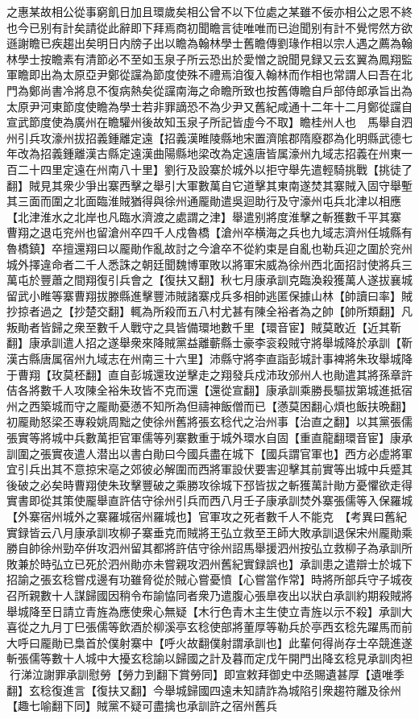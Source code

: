 之惠某故相公從事窮飢日加且環歲矣相公曾不以下位處之某雖不佞亦相公之恩不終也今已别有計矣請從此辭即下拜焉商初聞瞻言徒唯唯而已迨聞别有計不覺愕然方欲遜謝瞻已疾趨出矣明日内牓子出以瞻為翰林學士舊瞻傳劉瑑作相以宗人遇之薦為翰林學士按瞻素有清節必不至如玉泉子所云恐出於愛憎之說聞見録又云玄翼為鳳翔監軍瞻即出為太原亞尹鄭從讜為節度使殊不禮焉洎復入翰林而作相也常謂人曰吾在北門為鄭尚書冷將息不復病熱矣從讜南海之命瞻所致也按舊傳瞻自戶部侍郎承旨出為太原尹河東節度使瞻為學士若非罪謫恐不為少尹又舊紀咸通十二年十二月鄭從讜自宣武節度使為廣州在瞻驩州後故知玉泉子所記皆虛今不取】瞻桂州人也　馬舉自泗州引兵攻濠州拔招義鍾離定遠【招義漢睢陵縣地宋置濟隂郡隋廢郡為化明縣武德七年改為招義鍾離漢古縣定遠漢曲陽縣地梁改為定遠唐皆属濠州九域志招義在州東一百二十四里定遠在州南八十里】劉行及設寨於城外以拒守舉先遣輕騎挑戰【挑徒了翻】賊見其衆少爭出寨西擊之舉引大軍數萬自它道擊其東南遂焚其寨賊入固守舉塹其三面而圍之北面臨淮賊猶得與徐州通龎勛遣吳迴助行及守濠州屯兵北津以相應【北津淮水之北岸也凡臨水濟渡之處謂之津】舉遣别將度淮擊之斬獲數千平其寨　曹翔之退屯兖州也留滄州卒四千人戍魯橋【滄州卒横海之兵也九域志濟州任城縣有魯橋鎮】卒擅還翔曰以龎勛作亂故討之今滄卒不從約束是自亂也勒兵迎之圍於兖州城外擇違命者二千人悉誅之朝廷聞魏博軍敗以將軍宋威為徐州西北面招討使將兵三萬屯於豐蕭之間翔復引兵會之【復扶又翻】秋七月康承訓克臨渙殺獲萬人遂拔襄城留武小睢等寨曹翔拔滕縣進擊豐沛賊諸寨戍兵多相帥逃匿保據山林【帥讀曰率】賊抄掠者過之【抄楚交翻】輒為所殺而五八村尤甚有陳全裕者為之帥【帥所類翻】凡叛勛者皆歸之衆至數千人戰守之具皆備環地數千里【環音宦】賊莫敢近【近其靳翻】康承訓遣人招之遂舉衆來降賊黨益離蘄縣士豪李衮殺賊守將舉城降於承訓【靳漢古縣唐属宿州九域志在州南三十六里】沛縣守將李直詣彭城計事裨將朱玫舉城降于曹翔【玫莫柸翻】直自彭城還玫逆擊走之翔發兵戍沛玫邠州人也勛遣其將孫章許佶各將數千人攻陳全裕朱玫皆不克而還【還從宣翻】康承訓乘勝長驅拔第城進抵宿州之西築城而守之龎勛憂懣不知所為但禱神飯僧而已【懣莫困翻心煩也飯扶晩翻】　初龎勛怒梁丕專殺姚周黜之使徐州舊將張玄稔代之治州事【治直之翻】以其黨張儒張實等將城中兵數萬拒官軍儒等列寨數重于城外環水自固【重直龍翻環音宦】康承訓圍之張實夜遣人潜出以書白勛曰今國兵盡在城下【國兵謂官軍也】西方必虚將軍宜引兵出其不意掠宋亳之郊彼必解圍而西將軍設伏要害迎擊其前實等出城中兵蹙其後破之必矣時曹翔使朱玫擊豐破之乘勝攻徐城下邳皆拔之斬獲萬計勛方憂懼欲走得實書即從其策使龎舉直許佶守徐州引兵而西八月壬子康承訓焚外寨張儒等入保羅城【外寨宿州城外之寨羅城宿州羅城也】官軍攻之死者數千人不能克　【考異曰舊紀實録皆云八月康承訓攻柳子寨垂克而賊將王弘立救至王師大敗承訓退保宋州龎勛乘勝自帥徐州勁卒倂攻泗州留其都將許佶守徐州詔馬舉援泗州按弘立救柳子為承訓所敗兼於時弘立已死於泗州勛亦未嘗親攻泗州舊紀實録誤也】承訓患之遣辯士於城下招諭之張玄稔嘗戍邊有功雖脅從於賊心嘗憂憤【心嘗當作常】時將所部兵守子城夜召所親數十人謀歸國因稍令布諭恊同者衆乃遣腹心張臯夜出以狀白承訓約期殺賊將舉城降至日請立青旌為應使衆心無疑【木行色青木主生使立青旌以示不殺】承訓大喜從之九月丁巳張儒等飲酒於柳溪亭玄稔使部將董厚等勒兵於亭西玄稔先躍馬而前大呼曰龎勛已梟首於僕射寨中【呼火故翻僕射謂承訓也】此輩何得尚存士卒競進遂斬張儒等數十人城中大擾玄稔諭以歸國之計及暮而定戊午開門出降玄稔見承訓肉袒行涕泣謝罪承訓慰勞【勞力到翻下賞勞同】即宣敕拜御史中丞賜遺甚厚【遺唯季翻】玄稔復進言【復扶又翻】今舉城歸國四遠未知請詐為城陷引衆趨符離及徐州【趣七喻翻下同】賊黨不疑可盡擒也承訓許之宿州舊兵